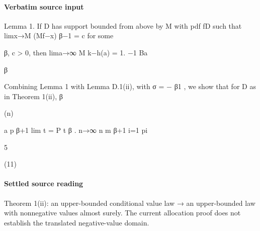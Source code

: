\documentclass[10pt]{article}
\begin{document}
\paragraph{Verbatim source input}
\begin{ReviewVerbatim}
Lemma 1. If D has support bounded from above by M with pdf fD such that limx→M (Mf−x)
β−1 = c for some

β, c > 0, then lima→∞ M k−h(a)
= 1.
−1
Ba

β

Combining Lemma 1 with Lemma D.1(ii), with σ = − β1 , we show that for D as in Theorem 1(ii),
β

(n)

a
p β+1
lim t = P t
β .
n→∞ n
m
β+1
i=1 pi

5

(11)
\end{ReviewVerbatim}

\paragraph{Settled source reading}
\begin{sloppypar}
Theorem 1(ii):\allowbreak{} an upper-\allowbreak{}bounded conditional value law → an upper-\allowbreak{}bounded law with nonnegative values almost surely.\allowbreak{} The current allocation proof does not establish the translated negative-\allowbreak{}value domain.\allowbreak{}
\end{sloppypar}
\end{document}

